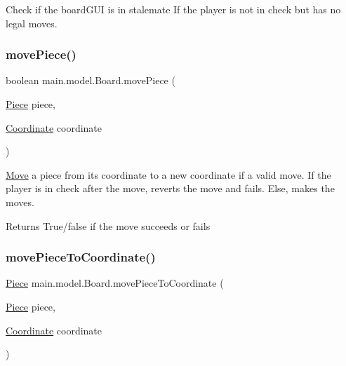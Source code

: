 Check if the board\+G\+UI is in stalemate If the player is not in check but has no legal moves. \hypertarget{classmain_1_1model_1_1_board_a8924f9087f10a4554958ac48480e9b0b}{}\label{classmain_1_1model_1_1_board_a8924f9087f10a4554958ac48480e9b0b} 
\subsubsection{\texorpdfstring{move\+Piece()}{movePiece()}}
{\footnotesize\ttfamily boolean main.\+model.\+Board.\+move\+Piece (\begin{DoxyParamCaption}\item[{\hyperlink{classmain_1_1pieces_1_1_piece}{Piece}}]{piece,  }\item[{\hyperlink{classmain_1_1model_1_1_coordinate}{Coordinate}}]{coordinate }\end{DoxyParamCaption})}

\hyperlink{classmain_1_1model_1_1_move}{Move} a piece from its coordinate to a new coordinate if a valid move. If the player is in check after the move, reverts the move and fails. Else, makes the moves. \begin{DoxyReturn}{Returns}
True/false if the move succeeds or fails 
\end{DoxyReturn}
\hypertarget{classmain_1_1model_1_1_board_abf3eb07b33b96a983bd98c26e7390ed4}{}\label{classmain_1_1model_1_1_board_abf3eb07b33b96a983bd98c26e7390ed4} 
\subsubsection{\texorpdfstring{move\+Piece\+To\+Coordinate()}{movePieceToCoordinate()}}
{\footnotesize\ttfamily \hyperlink{classmain_1_1pieces_1_1_piece}{Piece} main.\+model.\+Board.\+move\+Piece\+To\+Coordinate (\begin{DoxyParamCaption}\item[{\hyperlink{classmain_1_1pieces_1_1_piece}{Piece}}]{piece,  }\item[{\hyperlink{classmain_1_1model_1_1_coordinate}{Coordinate}}]{coordinate }\end{DoxyParamCaption})}

